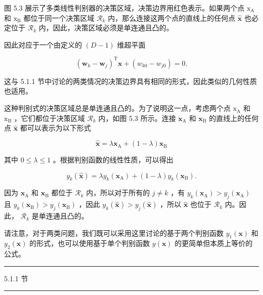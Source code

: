 \documentclass[10pt]{article}
\newcommand{\HRule}{\begin{center}\rule{0.9\linewidth}{0.2mm}\end{center}}
\begin{document}
图 5.3 展示了多类线性判别器的决策区域，决策边界用红色表示。如果两个点 \({\mathrm{x}}_{\mathrm{A}}\) 和 \({\mathrm{x}}_{\mathrm{B}}\) 都位于同一个决策区域 \({\mathcal{R}}_{k}\) 内，那么连接这两个点的直线上的任何点 \(\widehat{\mathbf{x}}\) 也必定位于 \({\mathcal{R}}_{k}\) 内，因此，决策区域必须是单连通且凸的。

因此对应于一个由定义的 \(\left( {D - 1}\right)\) 维超平面

\[
{\left( {\mathbf{w}}_{k} - {\mathbf{w}}_{j}\right) }^{\mathrm{T}}\mathbf{x} + \left( {{w}_{k0} - {w}_{j0}}\right)  = 0. \tag{5.8}
\]

这与 5.1.1 节中讨论的两类情况的决策边界具有相同的形式，因此类似的几何性质也适用。

这种判别式的决策区域总是单连通且凸的。为了说明这一点，考虑两个点 \({\mathrm{x}}_{\mathrm{A}}\) 和 \({\mathrm{x}}_{\mathrm{B}}\) ，它们都位于决策区域 \({\mathcal{R}}_{k}\) 内，如图 5.3 所示。连接 \({\mathbf{x}}_{\mathrm{A}}\) 和 \({\mathbf{x}}_{\mathrm{B}}\) 的直线上的任何点 \(\widehat{\mathbf{x}}\) 都可以表示为以下形式

\[
\widehat{\mathbf{x}} = \lambda {\mathbf{x}}_{\mathrm{A}} + \left( {1 - \lambda }\right) {\mathbf{x}}_{\mathrm{B}} \tag{5.9}
\]

其中 \(0 \leq  \lambda  \leq  1\) 。根据判别函数的线性性质，可以得出

\[
{y}_{k}\left( \widehat{\mathbf{x}}\right)  = \lambda {y}_{k}\left( {\mathbf{x}}_{\mathrm{A}}\right)  + \left( {1 - \lambda }\right) {y}_{k}\left( {\mathbf{x}}_{\mathrm{B}}\right) . \tag{5.10}
\]

因为 \({\mathbf{x}}_{\mathrm{A}}\) 和 \({\mathbf{x}}_{\mathrm{B}}\) 都位于 \({\mathcal{R}}_{k}\) 内，所以对于所有的 \(j \neq  k\) ，有 \({y}_{k}\left( {\mathbf{x}}_{\mathrm{A}}\right)  > {y}_{j}\left( {\mathbf{x}}_{\mathrm{A}}\right)\) 且 \({y}_{k}\left( {\mathbf{x}}_{\mathrm{B}}\right)  > {y}_{j}\left( {\mathbf{x}}_{\mathrm{B}}\right)\) ，因此 \({y}_{k}\left( \widehat{\mathbf{x}}\right)  > {y}_{j}\left( \widehat{\mathbf{x}}\right)\) ，所以 \(\widehat{\mathbf{x}}\) 也位于 \({\mathcal{R}}_{k}\) 内。因此， \({\mathcal{R}}_{k}\) 是单连通且凸的。

请注意，对于两类问题，我们既可以采用这里讨论的基于两个判别函数 \({y}_{1}\left( \mathbf{x}\right)\) 和 \({y}_{2}\left( \mathbf{x}\right)\) 的形式，也可以使用基于单个判别函数 \(y\left( \mathbf{x}\right)\) 的更简单但本质上等价的公式。

\HRule

5.1.1 节

\HRule
\end{document}
